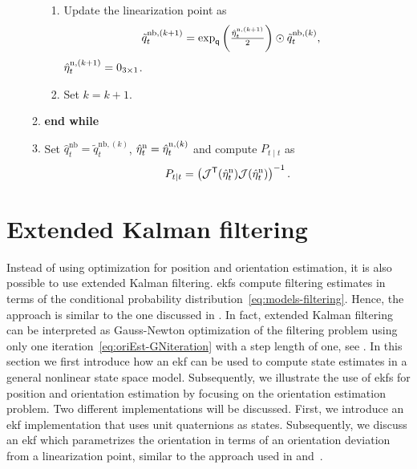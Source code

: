 \begin{algorithm}[ht]
\begin{enumerate}
\begin{enumerate}
\begin{enumerate}
\item Update the linearization point as 
\begin{align}
\tilde q^{\text{nb},(k+1)}_t &= \exp_\mathsf{q} \left( \tfrac{\hat{\eta}_t^{\text{n},(k+1)}}{2} \right) \odot \tilde{q}^{\text{nb},(k)}_t, 
\label{eq:oriEst-relinFiltering}
\end{align}
$\hat {\eta}_t^{\text{n},(k+1)} = 0_{3 \times 1}$.
\item Set $k = k+1$.
\end{enumerate}
\item[] \textbf{end while}
\item Set $\hat{q}^\text{nb}_{t} = \tilde{q}^{\text{nb},(k)}_{t}$, $\hat{\eta}^\text{n}_{t} = \hat{\eta}^{\text{n},(k)}_{t}$ and compute $P_{t \mid t}$ as
\begin{align}
P_{t \mid t} = \left( \mathcal{J}^{\mathsf{T}}(\hat{\eta}^\text{n}_{t}) \mathcal{J}(\hat{\eta}^\text{n}_{t}) \right)^{-1}.
\end{align}
\end{enumerate}
\end{enumerate}
\normalsize
\end{algorithm}

\section{Extended Kalman filtering}
\label{sec:oriEst-ekf}
Instead of using optimization for position and orientation estimation, it is also possible to use extended Kalman filtering. \Glspl{ekf} compute filtering estimates in terms of the conditional probability distribution~\eqref{eq:models-filtering}. Hence, the approach is similar to the one discussed in . In fact, extended Kalman filtering can be interpreted as Gauss-Newton optimization of the filtering problem using only one iteration~\eqref{eq:oriEst-GNiteration} with a step length of one, see \eg \cite{skoglundHA:2015}. In this section we first introduce how an \gls{ekf} can be used to compute state estimates in a general nonlinear state space model. Subsequently, we illustrate the use of \glspl{ekf} for position and orientation estimation by focusing on the orientation estimation problem. Two different implementations will be discussed. First, we introduce an \gls{ekf} implementation that uses unit quaternions as states. Subsequently, we discuss an \gls{ekf} which parametrizes the orientation in terms of an orientation deviation from a linearization point, similar to the approach used in  and~. 

